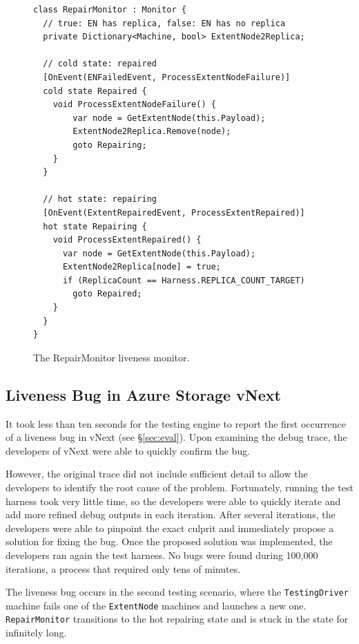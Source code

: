 \begin{figure}[t]
\begin{lstlisting}
class RepairMonitor : Monitor {
  // true: EN has replica, false: EN has no replica
  private Dictionary<Machine, bool> ExtentNode2Replica;

  // cold state: repaired
  [OnEvent(ENFailedEvent, ProcessExtentNodeFailure)]
  cold state Repaired {
    void ProcessExtentNodeFailure() {
        var node = GetExtentNode(this.Payload);
        ExtentNode2Replica.Remove(node);
        goto Repairing;
    }
  }

  // hot state: repairing
  [OnEvent(ExtentRepairedEvent, ProcessExtentRepaired)]
  hot state Repairing {
    void ProcessExtentRepaired() {
      var node = GetExtentNode(this.Payload);
      ExtentNode2Replica[node] = true;
      if (ReplicaCount == Harness.REPLICA_COUNT_TARGET)
        goto Repaired;
    }
  }
}
\end{lstlisting}
\vspace{-3mm}
\caption{The RepairMonitor liveness monitor.}
\label{fig:monitor}
\vspace{-2mm}
\end{figure}

\subsection{Liveness Bug in Azure Storage vNext}
\label{sec:method:azurestore}

It took less than ten seconds for the \psharp testing engine to report the first occurrence of a liveness bug in vNext (see \S\ref{sec:eval}). Upon examining the debug trace, the developers of vNext were able to quickly confirm the bug.

However, the original \psharp trace did not include sufficient detail to allow the developers to identify the root cause of the problem. Fortunately, running the test harness took very little time, so the developers were able to quickly iterate and add more refined debug outputs in each iteration. After several iterations, the developers were able to pinpoint the exact culprit and immediately propose a solution for fixing the bug. Once the proposed solution was implemented, the developers ran again the test harness. No bugs were found during 100,000 iterations, a process that required only tens of minutes.

The liveness bug occurs in the second testing scenario, where the \texttt{TestingDriver} machine fails one of the \texttt{ExtentNode} machines and launches a new one. \texttt{RepairMonitor} transitions to the hot repairing state and is stuck in the state for infinitely long.

